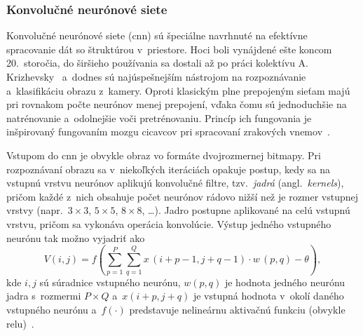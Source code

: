 
  \subsubsection{Konvolučné neurónové siete}\label{ssec:cnn}

    Konvolučné neurónové siete (\acrshort{cnn}) sú špeciálne navrhnuté na efektívne spracovanie dát so štruktúrou v~priestore. Hoci boli vynájdené ešte koncom 20.\ storočia, do širšieho používania sa dostali až po práci kolektívu A. Krizhevsky~\cite{krizhevskyImageNetClassificationDeep2012} a~dodnes sú najúspešnejším nástrojom na rozpoznávanie a~klasifikáciu obrazu z~kamery. Oproti klasickým plne prepojeným sieťam majú pri rovnakom počte neurónov menej prepojení, vďaka čomu sú jednoduchšie na natrénovanie a~odolnejšie voči pretrénovaniu. Princíp ich fungovania je inšpirovaný fungovaním mozgu cicavcov pri spracovaní zrakových vnemov~\cite{mehligMachineLearningNeural2021}.

    Vstupom do \acrshort{cnn} je obvykle obraz vo formáte dvojrozmernej bitmapy. Pri rozpoznávaní obrazu sa v~niekoľkých iteráciách opakuje postup, kedy sa na vstupnú vrstvu neurónov aplikujú konvolučné filtre, tzv.\ \emph{jadrá} (angl.\ \emph{kernels}), pričom každé z~nich obsahuje počet neurónov rádovo nižší než je rozmer vstupnej vrstvy (napr.\ $3 \times 3$, $5 \times 5$, $8 \times 8$, \dots). Jadro postupne aplikované na celú vstupnú vrstvu, pričom sa vykonáva operácia konvolúcie. Výstup jedného vstupného neurónu tak možno vyjadriť ako
    \begin{equation}
      V(i,j) = f\left( \sum_{p=1}^{P} \sum_{q=1}^{Q} x\, (i+p-1,j+q-1)\cdot w\, (p,q) - \theta \right),
    \end{equation}
    kde $i,j$ sú súradnice vstupného neurónu, $w(p,q)$ je hodnota jedného neurónu jadra s~rozmermi $P \times Q$ a~$x(i+p,j+q)$ je vstupná hodnota v~okolí daného vstupného neurónu a~$f(\cdot)$ predstavuje nelineárnu aktivačnú funkciu (obvykle \acrshort{relu})~\cite{mehligMachineLearningNeural2021}.
    
